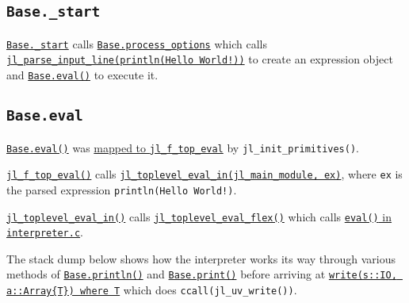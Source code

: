 \hypertarget{12561163861893339364}{}


\subsection{\texttt{Base.\_start}}



\href{https://github.com/JuliaLang/julia/blob/master/base/client.jl}{\texttt{Base.\_start}} calls \href{https://github.com/JuliaLang/julia/blob/master/base/client.jl}{\texttt{Base.process\_options}} which calls \href{https://github.com/JuliaLang/julia/blob/master/src/ast.c}{\texttt{jl\_parse\_input\_line({\textquotedbl}println({\textquotedbl}Hello World!{\textquotedbl}){\textquotedbl})}} to create an expression object and \hyperlink{7507639810592563424}{\texttt{Base.eval()}} to execute it.



\hypertarget{5161519074100035363}{}


\subsection{\texttt{Base.eval}}



\hyperlink{7507639810592563424}{\texttt{Base.eval()}} was \href{https://github.com/JuliaLang/julia/blob/master/src/builtins.c}{mapped to \texttt{jl\_f\_top\_eval}} by \texttt{jl\_init\_primitives()}.



\href{https://github.com/JuliaLang/julia/blob/master/src/builtins.c}{\texttt{jl\_f\_top\_eval()}} calls \href{https://github.com/JuliaLang/julia/blob/master/src/builtins.c}{\texttt{jl\_toplevel\_eval\_in(jl\_main\_module, ex)}}, where \texttt{ex} is the parsed expression \texttt{println({\textquotedbl}Hello World!{\textquotedbl})}.



\href{https://github.com/JuliaLang/julia/blob/master/src/builtins.c}{\texttt{jl\_toplevel\_eval\_in()}} calls \href{https://github.com/JuliaLang/julia/blob/master/src/toplevel.c}{\texttt{jl\_toplevel\_eval\_flex()}} which calls \href{https://github.com/JuliaLang/julia/blob/master/src/interpreter.c}{\texttt{eval()} in \texttt{interpreter.c}}.



The stack dump below shows how the interpreter works its way through various methods of \hyperlink{783803254548423222}{\texttt{Base.println()}} and \hyperlink{8248717042415202230}{\texttt{Base.print()}} before arriving at \href{https://github.com/JuliaLang/julia/blob/master/base/stream.jl}{\texttt{write(s::IO, a::Array\{T\}) where T}}  which does \texttt{ccall(jl\_uv\_write())}.



